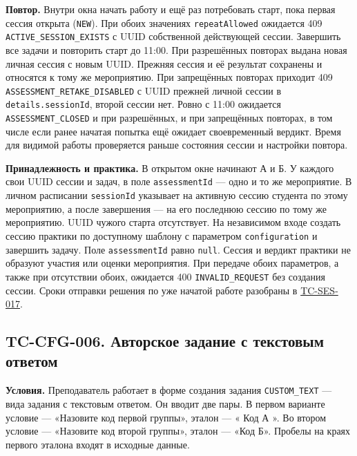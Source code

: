 \documentclass[12pt,a4paper]{article}
\begin{document}
\textbf{Повтор.} Внутри окна начать работу и ещё раз потребовать старт, пока первая сессия открыта (\texttt{NEW}). При обоих значениях \texttt{repeat\allowbreak{}Allowed} ожидается 409 \texttt{ACTIVE\_\allowbreak{}SESSION\_\allowbreak{}EXISTS} с UUID собственной действующей сессии. Завершить все задачи и повторить старт до 11:00. При разрешённых повторах выдана новая личная сессия с новым UUID. Прежняя сессия и её результат сохранены и относятся к тому же мероприятию. При запрещённых повторах приходит 409 \texttt{ASSESSMENT\_\allowbreak{}RETAKE\_\allowbreak{}DISABLED} с UUID прежней личной сессии в \texttt{details.\allowbreak{}session\allowbreak{}Id}, второй сессии нет. Ровно с 11:00 ожидается \texttt{ASSESSMENT\_\allowbreak{}CLOSED} и при разрешённых, и при запрещённых повторах, в том числе если ранее начатая попытка ещё ожидает своевременный вердикт. Время для видимой работы проверяется раньше состояния сессии и настройки повтора.

\textbf{Принадлежность и практика.} В открытом окне начинают А и Б. У каждого свои UUID сессии и задач, в поле \texttt{assessment\allowbreak{}Id} --- одно и то же мероприятие. В личном расписании \texttt{sessionId} указывает на активную сессию студента по этому мероприятию, а после завершения --- на его последнюю сессию по тому же мероприятию. UUID чужого старта отсутствует. На независимом входе создать сессию практики по доступному шаблону с параметром \texttt{configuration} и завершить задачу. Поле \texttt{assessment\allowbreak{}Id} равно \texttt{null}. Сессия и вердикт практики не образуют участия или оценки мероприятия. При передаче обоих параметров, а также при отсутствии обоих, ожидается 400 \texttt{INVALID\_\allowbreak{}REQUEST} без создания сессии. Сроки отправки решения по уже начатой работе разобраны в {\hyperlink{tc-ses-017}{TC-SES-017}}.

\subsection{TC-CFG-006. Авторское задание с текстовым ответом}\label{tc-cfg-006-ux430ux432ux442ux43eux440ux441ux43aux43eux435-ux437ux430ux434ux430ux43dux438ux435-ux441-ux442ux435ux43aux441ux442ux43eux432ux44bux43c-ux43eux442ux432ux435ux442ux43eux43c}

\hypertarget{tc-cfg-006-авторское-задание-с-текстовым-ответом}{}

\hypertarget{tc-cfg-006}{}

\textbf{Условия.} Преподаватель работает в форме создания задания \texttt{CUSTOM\_\allowbreak{}TEXT} --- вида задания с текстовым ответом. Он вводит две пары. В первом варианте условие --- «Назовите код первой группы», эталон --- « Код А ». Во втором условие --- «Назовите код второй группы», эталон --- «Код Б». Пробелы на краях первого эталона входят в исходные данные.
\end{document}
